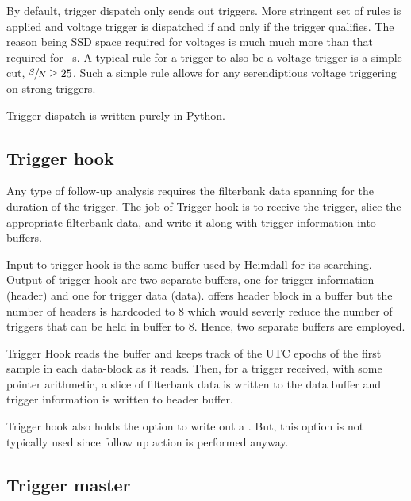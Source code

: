 \par By default, trigger dispatch only sends out \dbson triggers. More stringent set of rules is applied and voltage trigger is dispatched if and only if the trigger qualifies. The reason being SSD space required for voltages is much much more than that required for \dbson~s. 
A typical rule for a \dbson trigger to also be a voltage trigger is a simple \sn cut, $\sfrac{S}{N} \geq 25$. Such a simple rule allows for any serendiptious voltage triggering on strong triggers.

\par Trigger dispatch is written purely in Python.

\subsection {Trigger hook}

\par Any type of follow-up analysis requires the filterbank data spanning for the duration of the trigger. The job of Trigger hook is to receive the \dbson trigger, slice the appropriate filterbank data, and write it along with trigger information into \dada buffers.

\par Input to trigger hook is the same \dada buffer used by Heimdall for its searching. Output of trigger hook are two separate \dada buffers, one for trigger information (header) and one for trigger data (data). 
\dada offers header block in a buffer but the number of headers is hardcoded to $8$ which would severly reduce the number of triggers that can be held in buffer to $8$.  Hence, two separate buffers are employed.

\par Trigger Hook reads the buffer and keeps track of the UTC epochs of the first sample in each data-block as it reads. 
Then, for a trigger received, with some pointer arithmetic, a slice of filterbank data is written to the data \dada buffer and trigger information is written to header \dada buffer.

\par Trigger hook also holds the option to write out a \fbson. But, this option is not typically used since follow up action is performed anyway.

\subsection {Trigger master}

